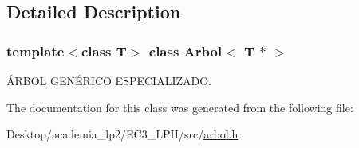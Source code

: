 \subsection{Detailed Description}
\subsubsection*{template$<$class T$>$ class Arbol$<$ T $\ast$ $>$}

ÁRBOL GENÉRICO ESPECIALIZADO. 

The documentation for this class was generated from the following file:\begin{CompactItemize}
\item 
Desktop/academia\_\-lp2/EC3\_\-LPII/src/\hyperlink{arbol_8h}{arbol.h}\end{CompactItemize}
